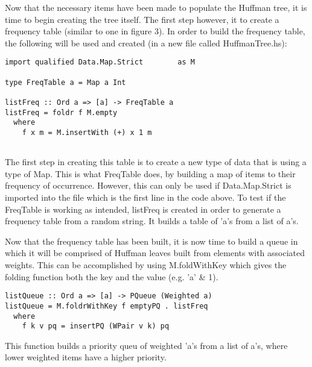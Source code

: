 \documentclass{article}
\begin{document}
Now that the necessary items have been made to populate the Huffman tree, it is time to begin creating the tree itself.
The first step however, it to create a frequency table (similar to one in figure 3).
In order to build the frequency table, the following will be used and created (in a new file called HuffmanTree.hs):
\begin{lstlisting}
import qualified Data.Map.Strict        as M

type FreqTable a = Map a Int

listFreq :: Ord a => [a] -> FreqTable a
listFreq = foldr f M.empty
  where
    f x m = M.insertWith (+) x 1 m
    
\end{lstlisting}
The first step in creating this table is to create a new type of data that is using a type of Map.
This is what FreqTable does, by building a map of items to their frequency of occurrence.
However, this can only be used if Data.Map.Strict is imported into the file which is the first line in the code above.
To test if the FreqTable is working as intended, listFreq is created in order to generate a frequency table from a random string. It builds a table of 'a's from a list of a's.

\medskip\noindent

Now that the frequency table has been built, it is now time to build a queue in which it will be comprised of Huffman leaves built from elements with associated weights.
This can be accomplished by using M.foldWithKey which gives the folding function both the key and the value (e.g. 'a' & 1).
\begin{lstlisting}
listQueue :: Ord a => [a] -> PQueue (Weighted a)
listQueue = M.foldrWithKey f emptyPQ . listFreq
  where
    f k v pq = insertPQ (WPair v k) pq
\end{lstlisting}
This function builds a priority queu of weighted 'a's from a list of a's, where lower weighted items have a higher priority.

\medskip\noindent
\end{document}
